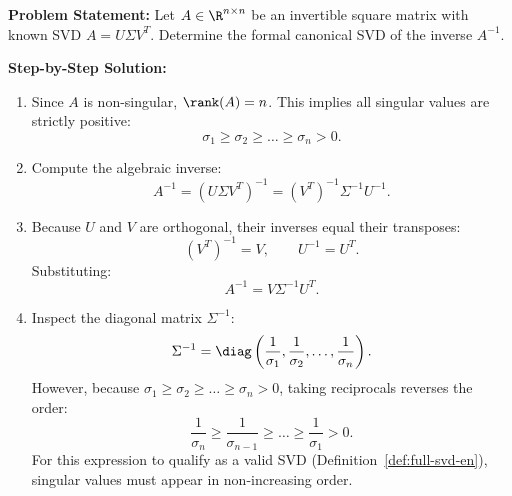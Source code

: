 \begin{example}
\textbf{Problem Statement:} Let $A \in \R^{n \times n}$ be an invertible square matrix with known SVD $A = U \Sigma V^T$. Determine the formal canonical SVD of the inverse $A^{-1}$.

\medskip
\textbf{Step-by-Step Solution:}
\begin{enumerate}
    \item Since $A$ is non-singular, $\rank(A) = n$. This implies all singular values are strictly positive:
    \begin{equation}
        \sigma_1 \ge \sigma_2 \ge \dots \ge \sigma_n > 0.
    \end{equation}
    \item Compute the algebraic inverse:
    \begin{equation}
        A^{-1} = (U \Sigma V^T)^{-1} = (V^T)^{-1} \Sigma^{-1} U^{-1}.
    \end{equation}
    \item Because $U$ and $V$ are orthogonal, their inverses equal their transposes:
    \begin{equation}
        (V^T)^{-1} = V, \qquad U^{-1} = U^T.
    \end{equation}
    Substituting:
    \begin{equation}
        A^{-1} = V \Sigma^{-1} U^T.
    \end{equation}
    \item Inspect the diagonal matrix $\Sigma^{-1}$:
    \begin{equation}
        \Sigma^{-1} = \diag\left(\frac{1}{\sigma_1}, \frac{1}{\sigma_2}, \dots, \frac{1}{\sigma_n}\right).
    \end{equation}
    However, because $\sigma_1 \ge \sigma_2 \ge \dots \ge \sigma_n > 0$, taking reciprocals reverses the order:
    \begin{equation}
        \frac{1}{\sigma_n} \ge \frac{1}{\sigma_{n-1}} \ge \dots \ge \frac{1}{\sigma_1} > 0.
    \end{equation}
    For this expression to qualify as a valid SVD (Definition~\ref{def:full-svd-en}), singular values must appear in non-increasing order.


\end{enumerate}
\end{example}
